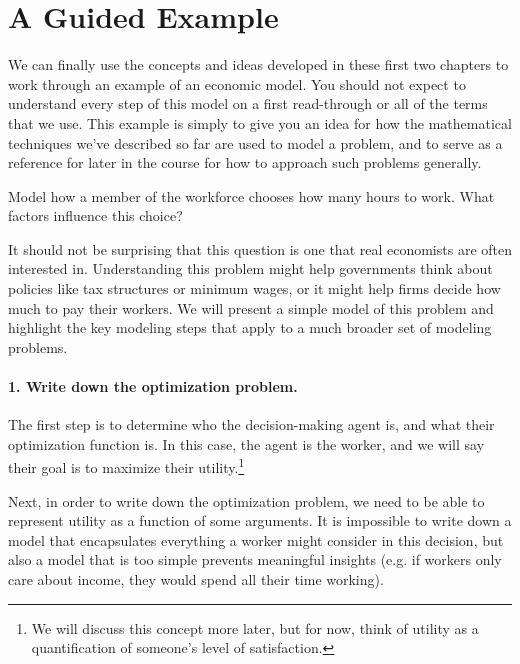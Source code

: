 \section{A Guided Example}

We can finally use the concepts and ideas developed in these first two chapters to work through an example of an economic model. You should not expect to understand every step of this model on a first read-through or all of the terms that we use. This example is simply to give you an idea for how the mathematical techniques we've described so far are used to model a problem, and to serve as a reference for later in the course for how to approach such problems generally.  

\begin{example*}
Model how a member of the workforce chooses how many hours to work. What factors influence this choice?
\end{example*}

It should not be surprising that this question is one that real economists are often interested in. Understanding this problem might help governments think about policies like tax structures or minimum wages, or it might help firms decide how much to pay their workers. We will present a simple model of this problem and highlight the key modeling steps that apply to a much broader set of modeling problems.

\paragraph{1. Write down the optimization problem.}

The first step is to determine who the decision-making agent is, and what their optimization function is. In this case, the agent is the worker, and we will say their goal is to maximize their utility.\footnote{We will discuss this concept more later, but for now, think of utility as a quantification of someone's level of satisfaction.} 

Next, in order to write down the optimization problem, we need to be able to represent utility as a function of some arguments. It is impossible to write down a model that encapsulates everything a worker might consider in this decision, but also a model that is too simple prevents meaningful insights (e.g. if workers only care about income, they would spend all their time working). 


